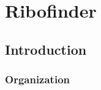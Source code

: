 
\chapter{Ribofinder}
\label{ch:rfinder}


\section{Introduction}
\label{sec:rfinder:intro}

\subsection{Organization}
\label{subsec:rfinder:org}
